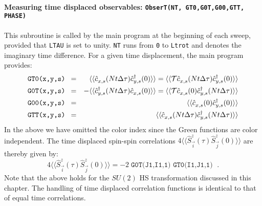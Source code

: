 \documentclass{SciPost}
\begin{document}
\paragraph{Measuring time displaced observables: \texttt{ObserT(NT,  GT0,G0T,G00,GTT, PHASE) }}
%
This subroutine is called by the main program at the beginning of each sweep, provided that \texttt{LTAU}  is set to unity.  \texttt{NT} runs from \texttt{0}  to \texttt{Ltrot} and denotes the   imaginary time difference.   For a given time  displacement, the main program provides:
\begin{eqnarray}
\texttt{GT0(x,y,s) }  &=&   \phantom{+} \langle \langle \hat{c}^{\phantom\dagger}_{x,s} (Nt \Delta \tau)   \hat{c}^{\dagger}_{y,s} (0)   \rangle \rangle = \langle \langle {\cal T} \hat{c}^{\phantom\dagger}_{x,s} (Nt \Delta \tau)   \hat{c}^{\dagger}_{y,s} (0)   \rangle \rangle  \nonumber \\
\texttt{G0T(x,y,s) }   &=&  -   \langle \langle   \hat{c}^{\dagger}_{y,s} (Nt \Delta \tau)    \hat{c}^{\phantom\dagger}_{x,s} (0)    \rangle \rangle =
    \langle \langle {\cal T} \hat{c}^{\phantom\dagger}_{x,s} (0)    \hat{c}^{\dagger}_{y,s} (Nt \Delta \tau)   \rangle \rangle  \nonumber  \\
  \texttt{G00(x,y,s) }  &=&    \phantom{+} \langle \langle \hat{c}^{\phantom\dagger}_{x,s} (0)   \hat{c}^{\dagger}_{y,s} (0)   \rangle \rangle    \nonumber \\
    \texttt{GTT(x,y,s) }  &=&   \phantom{+} \langle \langle \hat{c}^{\phantom\dagger}_{x,s} (Nt \Delta \tau)   \hat{c}^{\dagger}_{y,s} (Nt \Delta \tau)   \rangle \rangle    
\end{eqnarray}
In the above we have omitted the color index since  the  Green functions are color independent.  The time displaced  spin-spin correlations 
$ 4 \langle \langle \hat{S}^{z}_{\vec{i}} (\tau)  \hat{S}^{z}_{\vec{j}} (0)\rangle \rangle   $ 
are thereby given by: 
\begin{equation}
	4 \langle \langle \hat{S}^{z}_{\vec{i}} (\tau)  \hat{S}^{z}_{\vec{j}} (0)\rangle \rangle   = - 2 \; \texttt{G0T(J1,I1,1) } \texttt{GT0(I1,J1,1) } \;.
\end{equation}
Note that the above holds for the $SU(2)$ HS transformation discussed in this chapter. 
The handling of time displaced correlation functions is identical to that of equal time correlations. 
%
\end{document}
